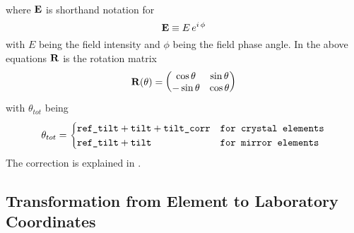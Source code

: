 \begin{enumerate}
\begin{align}
\end{align}
where ${\bf E}$ is shorthand notation for
\begin{equation}
  {\bf E} \equiv E \, e^{i \, \phi}
\end{equation}
with $E$ being the field intensity and $\phi$ being the field phase angle.
In the above equations ${\bf R}$ is the rotation matrix
\begin{equation}
  {\bf R}(\theta) = \begin{pmatrix} \cos\theta & \sin\theta \\ -\sin\theta & \cos\theta \end{pmatrix}
\end{equation}
with $\theta_{tot}$ being 
\begin{equation}
  \theta_{tot}  = 
  \begin{cases}
    \vn{ref_tilt} + \vn{tilt} + \vn{tilt_corr} & \vn{for crystal elements} \\
    \vn{ref_tilt} + \vn{tilt} & \vn{for mirror elements}
  \end{cases}
  \label{tttt}
\end{equation}
The  correction is explained in .
\end{enumerate}

\subsection{Transformation from Element to Laboratory Coordinates}
\label{s:crystal.trans.el}

